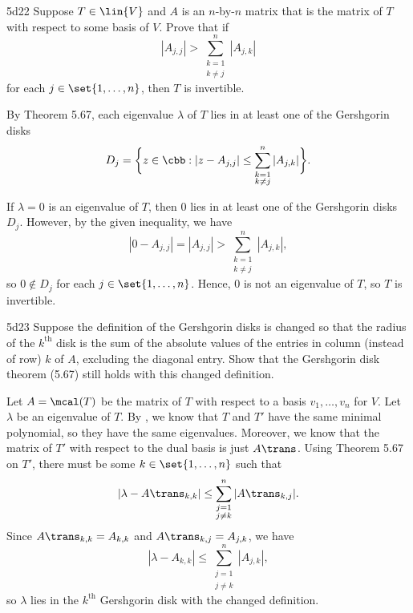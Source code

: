 \begin{exercise}{5d22}
    Suppose $T \in \lin{V}$ and $A$ is an $n$-by-$n$ matrix that is the matrix of $T$ with respect to some basis of $V$.
    Prove that if
    \[
        |A_{j, j}| > \sum_{\substack{k=1 \\ k \neq j}}^{n} |A_{j, k}|
    \]
    for each $j \in \set{1, \ldots, n}$, then $T$ is invertible.
    
\end{exercise}

\begin{sol}
    By Theorem 5.67, each eigenvalue $\lambda$ of $T$ lies in at least one of the Gershgorin disks
    \[
        D_j = \bigg\{z \in \cbb : |z - A_{j, j}| \leq \sum_{\substack{k=1 \\ k \neq j}}^{n} |A_{j, k}|\bigg\}.
    \]
    
    If $\lambda = 0$ is an eigenvalue of $T$, then $0$ lies in at least one of the Gershgorin disks $D_j$.
    However, by the given inequality, we have
    \[
        |0 - A_{j, j}| = |A_{j, j}| > \sum_{\substack{k=1 \\ k \neq j}}^{n} |A_{j, k}|,
    \]
    so $0 \notin D_j$ for each $j \in \set{1, \ldots, n}$.
    Hence, $0$ is not an eigenvalue of $T$, so $T$ is invertible.
\end{sol}

\begin{exercise}{5d23}
    Suppose the definition of the Gershgorin disks is changed so that the radius of the $k^{\text{th}}$ disk is the sum of the absolute values of the entries in column (instead of row) $k$ of $A$, excluding the diagonal entry.
    Show that the Gershgorin disk theorem (5.67) still holds with this changed definition.
\end{exercise}

\begin{sol}
    Let $A = \mcal(T)$ be the matrix of $T$ with respect to a basis $v_1, \ldots, v_n$ for $V$.
    Let $\lambda$ be an eigenvalue of $T$.
    By , we know that $T$ and $T'$ have the same minimal polynomial, so they have the same eigenvalues.
    Moreover, we know that the matrix of $T'$ with respect to the dual basis is just $A\trans$.
    Using Theorem 5.67 on $T'$, there must be some $k \in \set{1, \ldots, n}$ such that
    \[
        |\lambda - A\trans_{k, k}| \leq \sum_{\substack{j=1 \\ j \neq k}}^{n} |A\trans_{k, j}|.
    \]
    Since $A\trans_{k, k} = A_{k, k}$ and $A\trans_{k, j} = A_{j, k}$, we have
    \[
        |\lambda - A_{k, k}| \leq \sum_{\substack{j=1 \\ j \neq k}}^{n} |A_{j, k}|,
    \]
    so $\lambda$ lies in the $k^{\text{th}}$ Gershgorin disk with the changed definition.
\end{sol}
